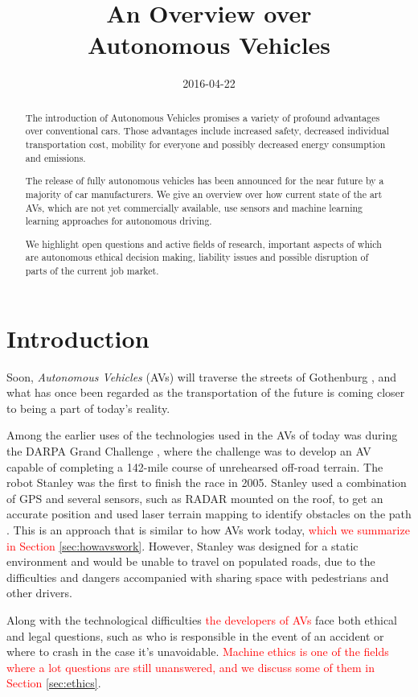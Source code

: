 \documentclass[11pt]{article}
\title{An Overview over \\ Autonomous Vehicles}
\date{2016-04-22}
\newcommand{\changed}[1]{\textcolor{red}{#1}}
\begin{document}
\maketitle
\begin{abstract}
The introduction of Autonomous Vehicles promises a variety of profound advantages over conventional cars. Those advantages include increased safety, decreased individual transportation cost, mobility for everyone and possibly decreased energy consumption and emissions. 

The release of fully autonomous vehicles has been announced for the near future by a majority of car manufacturers. We give an overview over how current state of the art AVs, which are not yet commercially available, use sensors and machine learning learning approaches for autonomous driving.

We highlight open questions and active fields of research, important aspects of which are autonomous ethical decision making, liability issues and possible disruption of parts of the current job market.
\end{abstract}

\section{Introduction}
Soon, \textit{Autonomous Vehicles} (AVs) will traverse the streets of Gothenburg , and what has once been regarded as the transportation of the future is coming closer to being a part of today's reality. 

Among the earlier uses of the technologies used in the AVs of today was during the DARPA Grand Challenge , where the challenge was to develop an AV capable of completing a 142-mile course of unrehearsed off-road terrain. The robot Stanley was the first to finish the race in 2005. Stanley used a combination of GPS and several sensors, such as RADAR mounted on the roof, to get an accurate position and used laser terrain mapping to identify obstacles on the path \cite{Thrun2006stanley}. This is an approach that is similar to how AVs work today, \changed{which we summarize in Section \ref{sec:howavswork}}. However, Stanley was designed for a static environment and would be unable to travel on populated roads, due to the difficulties and dangers accompanied with sharing space with pedestrians and other drivers.

Along with the technological difficulties \changed{the developers of AVs} face both ethical and legal questions, such as who is responsible in the event of an accident or where to crash in the case it's unavoidable. \changed{Machine ethics is one of the fields where a lot questions are still unanswered, and we discuss some of them in Section \ref{sec:ethics}}.
\end{document}
